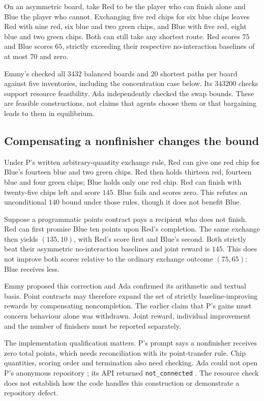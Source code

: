 \documentclass{article}
\begin{document}
On an asymmetric board, take Red to be the player who can finish alone and Blue the player who cannot.
Exchanging five red chips for six blue chips leaves Red with nine red, six blue and two green chips, and Blue
with five red, eight blue and two green chips. Both can still take any shortest route. Red scores \(75\) and
Blue scores \(65\), strictly exceeding their respective no-interaction baselines of at most \(70\) and zero.

Emmy's  checked all \(3432\) balanced boards and \(20\) shortest paths per board
against five inventories, including the concentration case below. Its \(343200\) checks support resource
feasibility. Ada independently checked the swap bounds. These are feasible constructions, not claims that
agents choose them or that bargaining leads to them in equilibrium.

\subsection{Compensating a nonfinisher changes the bound}
Under P's written arbitrary-quantity exchange rule, Red can give one red chip for Blue's fourteen blue and two
green chips. Red then holds thirteen red, fourteen blue and four green chips; Blue holds only one red chip.
Red can finish with twenty-five chips left and score \(145\). Blue fails and scores zero. This refutes an
unconditional \(140\) bound under those rules, though it does not benefit Blue.

Suppose a programmatic points contract pays a recipient who does not finish. Red can first promise Blue ten
points upon Red's completion. The same exchange then yields \((135,10)\), with Red's score first and Blue's
second. Both strictly beat their asymmetric no-interaction baselines and joint reward is \(145\). This does
not improve both scores relative to the ordinary exchange outcome \((75,65)\): Blue receives less.

Emmy proposed this correction and Ada confirmed its arithmetic and textual basis. Point contracts may
therefore expand the set of strictly baseline-improving rewards by compensating noncompletion. The earlier
claim that P's gains must concern behaviour alone was withdrawn. Joint reward, individual improvement and the
number of finishers must be reported separately.

The implementation qualification matters. P's prompt says a nonfinisher receives zero total points, which
needs reconciliation with its point-transfer rule. Chip quantities, scoring order and termination also need
checking. Ada could not open P's anonymous repository \cite{prepo}; its API returned \texttt{not\_connected}
\cite{papi}. The resource check does not establish how the code handles this construction or demonstrate a
repository defect.
\end{document}

